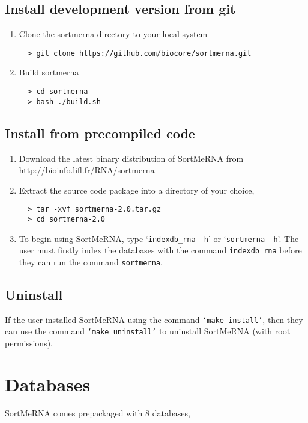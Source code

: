 \documentclass[10pt,a4paper]{article}
\begin{document}
\subsection{Install development version from git}
\label{sec:install}

\begin{enumerate}
 \item Clone the sortmerna directory to your local system
 \begin{verbatim}
  > git clone https://github.com/biocore/sortmerna.git
 \end{verbatim}
 \item Build sortmerna
  \begin{verbatim}
  > cd sortmerna
  > bash ./build.sh
 \end{verbatim}



\end{enumerate}

\subsection{Install from precompiled code}

\begin{enumerate}
 \item Download the latest binary distribution of SortMeRNA from \url{http://bioinfo.lifl.fr/RNA/sortmerna}
 \item Extract the source code package into a directory of your choice,
 \begin{verbatim}
  > tar -xvf sortmerna-2.0.tar.gz 
  > cd sortmerna-2.0
 \end{verbatim}
 \item To begin using SortMeRNA, type `\texttt{indexdb\_rna -h}' or `\texttt{sortmerna -h}'. The user must firstly index 
 the databases with the command \texttt{indexdb\_rna} before they can run the command \texttt{sortmerna}.
 
\end{enumerate}

\subsection{Uninstall}

\noindent If the user installed SortMeRNA using the command \texttt{`make install'}, then they can use the command \texttt{`make uninstall'} to
uninstall SortMeRNA (with root permissions).

\section{Databases}
\noindent SortMeRNA comes prepackaged with 8 databases,\\
\end{document}
